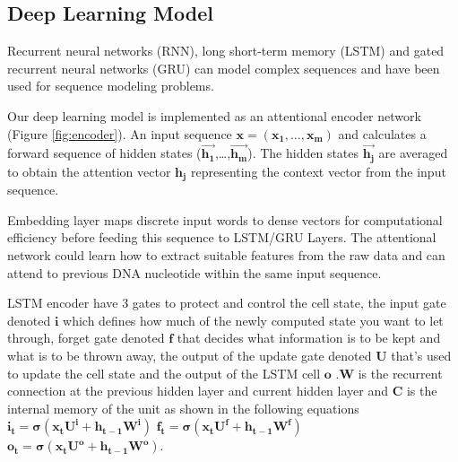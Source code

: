 \documentclass[10pt,journal,compsoc]{IEEEtran}
\begin{document}

\subsection{Deep Learning Model}
Recurrent neural networks (RNN), long short-term memory (LSTM) \cite{hochreiter1997long} and gated recurrent neural networks (GRU) \cite{chung2014empirical} can model complex sequences and have been used for sequence modeling problems.

Our deep learning model is implemented as an attentional encoder network (Figure \ref{fig:encoder}). An input sequence  $\mathbf{x = (x_{1} , \ldots{} , x_{m} )}$  and calculates a forward sequence of hidden states  ($\mathbf{\overrightarrow{h_{1}}}$,\ldots{},$\mathbf{ \overrightarrow{h_{m}}}$). The hidden states $\mathbf{\overrightarrow{h_{j}}}$  are averaged to obtain the attention vector $\mathbf{h_{j}}$ representing the context vector from the input sequence.

Embedding layer maps discrete input words to dense vectors for computational efficiency before feeding this sequence to LSTM/GRU Layers. The attentional network could learn how to extract suitable features from the raw data and can attend to previous DNA nucleotide within the same input sequence. 

LSTM encoder have 3 gates to protect and control the cell state, the input gate denoted $\mathbf{i}$ which defines how much of the newly computed state you want to let through, forget gate denoted $\mathbf{f}$ that decides what information is to be kept and what is to be thrown away,  the output of the update gate denoted $\mathbf{U}$ that's used to update the cell state and the output of the LSTM cell $\mathbf{o}$ .$\mathbf{W}$ is the recurrent connection at the previous hidden layer and current hidden layer and $\mathbf{C}$ is the internal memory of the unit  as shown in the following equations \newline
$\mathbf{i_{t}=\sigma(x_{t}U^i + h_{t-1}W^i)}$ \newline
$\mathbf{f_{t}=\sigma(x_{t}U^f + h_{t-1}W^f)}$ \newline
$\mathbf{o_{t}=\sigma(x_{t}U^o + h_{t-1}W^o)}$. 
\end{document}
